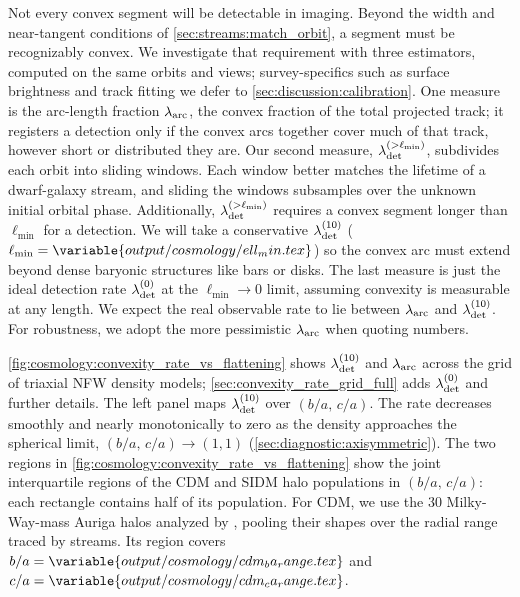 \documentclass[linenumbers,twocolumn]{aastex701}
\newcommand{\lamdadet}[1]{\ensuremath{\lambda_{\rm det}^{({#1})}}}
\begin{document}
        Not every convex segment will be detectable in imaging. %
        Beyond the width and near-tangent conditions of \autoref{sec:streams:match_orbit}, a segment must be recognizably convex. %
        We investigate that requirement with three estimators, computed on the same orbits and views; survey-specifics such as surface brightness and track fitting we defer to \autoref{sec:discussion:calibration}. %
        One measure is the arc-length fraction $\lambda_{\rm arc}$, the convex fraction of the total projected track; it registers a detection only if the convex arcs together cover much of that track, however short or distributed they are. %
        Our second measure, $\lambda_{\rm det}^{(>\ell_{\min})}$, subdivides each  orbit into sliding  windows. %
        Each window better matches the lifetime of a dwarf-galaxy stream, and sliding the windows subsamples over the unknown initial orbital phase. %
        Additionally, $\lambda_{\rm det}^{(>\ell_{\min})}$ requires a convex segment longer than $\ell_{\min}$ for a detection. %
        We will take a conservative $\lamdadet{10}$ ($\ell_{\min} = \variable{output/cosmology/ell_min.tex}$) so the convex arc must extend beyond dense baryonic structures like bars or disks. %
        The last measure is just the ideal detection rate $\lamdadet{0}$ at the $\ell_{\min}\!\to\!0$ limit, assuming convexity is measurable at any length. %
        We expect the real observable rate to lie between $\lambda_{\rm arc}$ and $\lamdadet{10}$. %
        For robustness, we adopt the more pessimistic $\lambda_{\rm arc}$ when quoting numbers. %

        \autoref{fig:cosmology:convexity_rate_vs_flattening} shows $\lamdadet{10}$ and $\lambda_{\rm arc}$ across the grid of triaxial \gls{NFW} density models; \autoref{sec:convexity_rate_grid_full} adds $\lamdadet{0}$ and further details. %
        The left panel maps $\lamdadet{10}$ over $(b/a,\,c/a)$. %
        The rate decreases smoothly and nearly monotonically to zero as the density approaches the spherical limit, $(b/a,\,c/a)\to(1,1)$ (\autoref{sec:diagnostic:axisymmetric}). %
        The two regions in \autoref{fig:cosmology:convexity_rate_vs_flattening} show the joint interquartile regions of the \gls{CDM} and \gls{SIDM} halo populations in $(b/a,\,c/a)$: each rectangle contains half of its population. %
        For \gls{CDM}, we use the 30 Milky-Way-mass Auriga halos analyzed by \citet{Prada+:2019:DarkMatterHalo}, pooling their shapes over the radial range traced by streams. %
        Its region covers $b/a=\variable{output/cosmology/cdm_ba_range.tex}$ and $c/a=\variable{output/cosmology/cdm_ca_range.tex}$. %
\end{document}
